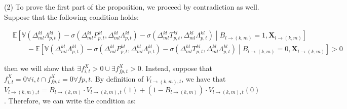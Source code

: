 (2) To prove the first part of the proposition, we proceed by contradiction as well. Suppose that the following condition holds: 
\begin{linenomath*}
    \begin{equation*}
        \begin{aligned}
            & \mathbb{E}
                \left[
                    \mathbb{V}\left(\Delta_{ml}^{kl}\Lambda_{p,t}^{kl}\right)
                        - \sigma\left(\Delta_{ml}^{kl}P_{p,t}^{kl},\Delta_{ml}^{kl}\Lambda_{p,t}^{kl}\right)
                        - \sigma\left(\Delta_{ml}^{kl}T_{p,t}^{kl},\Delta_{ml}^{kl}\Lambda_{p,t}^{kl}\right)
                    \middle\vert  B_{l \rightarrow (k,m)} = 1, \boldsymbol{X}_{l \rightarrow (k,m)}
                \right] \\
            & \qquad -  
                \mathbb{E}
                \left[
                    \mathbb{V}\left(\Delta_{ml}^{kl}\Lambda_{p,t}^{kl}\right) 
                        - \sigma\left(\Delta_{ml}^{kl}P_{p,t}^{kl},\Delta_{ml}^{kl}\Lambda_{p,t}^{kl}\right)
                        - \sigma\left(\Delta_{ml}^{kl}T_{p,t}^{kl},\Delta_{ml}^{kl}\Lambda_{p,t}^{kl}\right)
                    \middle\vert  B_{l \rightarrow (k,m)} = 0, \boldsymbol{X}_{l \rightarrow (k,m)}
                \right] > 0
        \end{aligned}
    \end{equation*}
\end{linenomath*}
then we will show that $\exists f^X_{i,t} > 0 \cup \exists f^X_{fp,t} > 0$. Instead, suppose that $f^X_{i,t} = 0 \forall i,t \cap f^X_{fp,t} = 0 \forall fp,t$. By definition of $V_{l \rightarrow (k,m),t}$, we have that $V_{l \rightarrow (k,m),t} = B_{l \rightarrow (k,m)}\cdot V_{l \rightarrow (k,m),t}(1) + \left(1-B_{l \rightarrow (k,m)}\right)\cdot V_{l \rightarrow (k,m),t}(0)$. Therefore, we can write the condition as:
